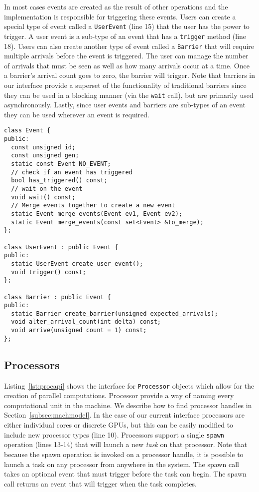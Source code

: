 In most cases events are created as the result of other
operations and the implementation is responsible for triggering these events.  Users 
can create a special type of event called a {\tt UserEvent} (line 15) that the
user has the power to trigger.  A user event is a sub-type of an event
that has a {\tt trigger} method (line 18).  Users can also create another
type of event called a {\tt Barrier} that will require multiple arrivals before
the event is triggered.  The user can manage the number of arrivals that must
be seen as well as how many arrivals occur at a time.  Once a barrier's arrival
count goes to zero, the barrier will trigger.  Note that barriers in our interface
provide a superset of the functionality of traditional barriers since they can
be used in a blocking manner (via the {\tt wait} call), but are primarily used
asynchronously.  Lastly, since user events and barriers are sub-types of 
an event they can be used wherever an event is required.

\begin{lstlisting}[float={t},label={lst:eventapi},caption={Event Interface.}]
class Event {
public:
  const unsigned id;
  const unsigned gen;
  static const Event NO_EVENT;
  // check if an event has triggered
  bool has_triggered() const;
  // wait on the event
  void wait() const;
  // Merge events together to create a new event
  static Event merge_events(Event ev1, Event ev2);
  static Event merge_events(const set<Event> &to_merge);
};

class UserEvent : public Event {
public:
  static UserEvent create_user_event();
  void trigger() const;
};

class Barrier : public Event {
public:
  static Barrier create_barrier(unsigned expected_arrivals);
  void alter_arrival_count(int delta) const;
  void arrive(unsigned count = 1) const;
};
\end{lstlisting}

\subsection{Processors}
\label{subsec:procs}
Listing~\ref{lst:procapi} shows the interface for {\tt Processor} objects which allow for
the creation of parallel computations.  Processor provide a way of naming 
every computational unit in the machine.  We describe how to find processor handles
in Section~\ref{subsec:machmodel}.  In the case of our current interface 
processors are either individual cores or discrete GPUs, but this can be easily modified 
to include new processor types (line 10).   Processors support a single {\tt spawn}
operation (lines 13-14) that will launch a new {\em task} on that processor.
Note that because the spawn operation
is invoked on a processor handle, it is possible to launch a task on any
processor from anywhere in the system.  
The spawn call takes an optional event that must trigger before the task can begin.  
The spawn call returns an event that will trigger when the task completes.

